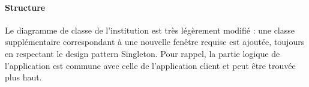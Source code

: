 \paragraph{Structure} Le diagramme de classe de l'institution est très légèrement modifié : une classe supplémentaire correspondant à une nouvelle fenêtre requise est ajoutée, toujours en respectant le design pattern Singleton. Pour rappel, la partie logique de l'application est commune avec celle de l'application client et peut être trouvée plus haut.